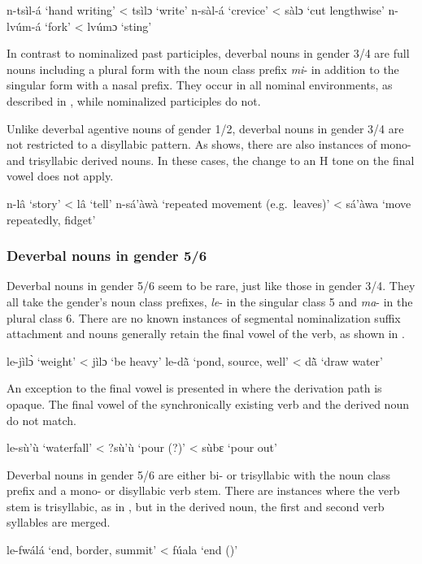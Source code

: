 \ea \label{34dNa}
\ea  n-tsìl-á `hand writing' < tsìlɔ `write'
\ex n-sàl-á `crevice' < sàlɔ `cut lengthwise'
\ex  n-lvúm-á `fork' <  lvúmɔ `sting'
\z
\z

In contrast to nominalized past participles, deverbal nouns in gender 3/4 are full nouns including a plural form with the noun class prefix {\itshape mi}- in addition to the singular form with a nasal prefix. They occur in all nominal environments, as described in , while nominalized participles do not.

Unlike deverbal agentive nouns of gender 1/2, deverbal nouns in gender 3/4 are not restricted to a disyllabic pattern. As  shows, there are also instances of mono- and trisyllabic derived nouns. In these cases, the change to an H tone on the final vowel does not apply.
 
\ea \label{34dNb}
\ea  n-lâ `story' < lâ `tell'
\ex n-sá'àwà `repeated movement (e.g.\ leaves)' < sá'àwa `move repeatedly, fidget'
\z
\z

\subsubsection{Deverbal nouns in gender 5/6}
\label{sec:NOM56}

Deverbal nouns in gender 5/6 seem to be rare, just like those in gender 3/4. They all take the gender's noun class prefixes, {\itshape le}- in the singular class 5 and {\itshape ma}- in the plural class 6. There are no known instances of segmental nominalization suffix attachment and nouns generally retain the final vowel of the verb, as shown in .

\ea \label{56dNa}
\ea  le-jìlɔ̀ `weight' <  jìlɔ `be heavy'
\ex le-dã̀ `pond, source, well'  <  dã̀ `draw water'
\z
\z

\noindent An exception to the final vowel is presented in  where the derivation path is opaque. The final vowel of the synchronically existing verb and the derived noun do not match.

\ea \label{56exc} le-sù'ù `waterfall' < ?sù'ù `pour (?)'  < sùbɛ `pour out'
\z

Deverbal nouns in gender 5/6 are either bi- or trisyllabic with the noun class prefix and a mono- or disyllabic verb stem. There are instances where the verb stem is trisyllabic, as in , but in the derived noun, the first and second verb syllables are merged.

\ea \label{56dNb} le-fwálá `end, border, summit' <  fúala `end ({\RECIP})'
\z

